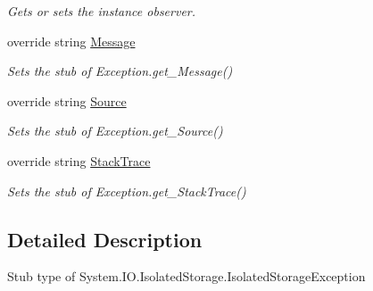 \begin{DoxyCompactItemize}
\begin{DoxyCompactList}\small\item\em Gets or sets the instance observer.\end{DoxyCompactList}\item 
override string \hyperlink{class_system_1_1_i_o_1_1_isolated_storage_1_1_fakes_1_1_stub_isolated_storage_exception_af9835322e17ca51ec6eb1d0e21503c8b}{Message}
\begin{DoxyCompactList}\small\item\em Sets the stub of Exception.\-get\-\_\-\-Message()\end{DoxyCompactList}\item 
override string \hyperlink{class_system_1_1_i_o_1_1_isolated_storage_1_1_fakes_1_1_stub_isolated_storage_exception_a99a67d0bb42a66d1e4af7c6d9aefe820}{Source}
\begin{DoxyCompactList}\small\item\em Sets the stub of Exception.\-get\-\_\-\-Source()\end{DoxyCompactList}\item 
override string \hyperlink{class_system_1_1_i_o_1_1_isolated_storage_1_1_fakes_1_1_stub_isolated_storage_exception_ae0006324fd838839924cb0a72afb6232}{Stack\-Trace}
\begin{DoxyCompactList}\small\item\em Sets the stub of Exception.\-get\-\_\-\-Stack\-Trace()\end{DoxyCompactList}\end{DoxyCompactItemize}


\subsection{Detailed Description}
Stub type of System.\-I\-O.\-Isolated\-Storage.\-Isolated\-Storage\-Exception



